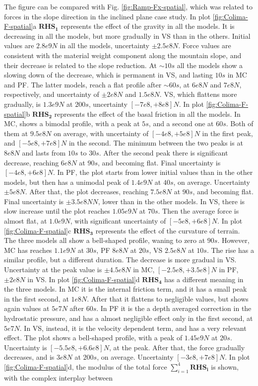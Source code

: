 \documentclass{article}
\begin{document}
The figure can be compared with Fig. \ref{fig:Ramp-Fx-spatial}, which was related to forces in the slope direction in the inclined plane case study. In plot \ref{fig:Colima-F-spatial}a $\boldsymbol{RHS_1}$ represents the effect of the gravity in all the models. It is decreasing in all the models, but more gradually in VS than in the others. Initial values are $2.8e9 N$ in all the models, uncertainty $\pm 2.5e8 N$. Force values are consistent with the material weight component along the mountain slope, and their decrease is related to the slope reduction. At $\sim 10 s$ all the models show a slowing down of the decrease, which is permanent in VS, and lasting $10 s$ in MC and PF. The latter models, reach a flat profile after $\sim 60 s$, at $6e8 N$ and $7e8 N$, respectively, and uncertainty of $\pm 2e8 N$ and $1.5e8 N$. VS, which flattens more gradually, is $1.3e9 N$ at $200 s$, uncertainty $[-7e8,+8e8] N$. In plot  \ref{fig:Colima-F-spatial}b $\boldsymbol{RHS_2}$ represents the effect of the basal friction in all the models. In MC, shows a bimodal profile, with a peak at $5 s$, and a second one at $60 s$. Both of them at $9.5e8 N$ on average, with uncertainty of $[-4e8,+5e8] N$ in the first peak, and $[-5e8,+7e8] N$ in the second. The minimum between the two peaks is at $8e8 N$ and lasts from $10 s$ to $30 s$. After the second peak there is significant decrease, reaching $6e8 N$ at $90 s$, and becoming flat. Final uncertainty is $[-4e8, +6e8] N$. In PF, the plot starts from lower initial values than in the other models, but then has a unimodal peak of $1.4e9 N$ at $40 s$, on average. Uncertainty $\pm 5e8 N$. After that, the plot decreases, reaching $7.5e8 N$ at $90 s$, and becoming flat. Final uncertainty is $\pm 3.5e8 N N$, lower than in the other models. In VS, there is slow increase until the plot reaches $1.05e9 N$ at $70 s$. Then the average force is almost flat, at $1.0e9 N$, with significant uncertainty of $[-5e8,+6e8] N$. In plot \ref{fig:Colima-F-spatial}c $\boldsymbol{RHS_3}$ represents the effect of the curvature of terrain. The three models all show a bell-shaped profile, waning to zero at $90 s$. However, MC has reaches $1.1e9 N$ at $30 s$, PF $8e8 N$ at $20 s$, VS $2.5e8 N$ at $10 s$. The rise has a similar profile, but a different duration. The decrease is more gradual in VS. Uncertainty at the peak value is $\pm 4.5e8 N$ in MC, $[-2.5e8,+3.5e8] N$ in PF, $\pm 2e8 N$ in VS. In plot \ref{fig:Colima-F-spatial}d $\boldsymbol{RHS_4}$ has a different meaning in the three models. In MC it is the internal friction term, and it has a small peak in the first second, at $1e8 N$. After that it flattens to negligible values, but shows again values at $5e7 N$ after $60 s$. In PF it is the a depth averaged correction in the hydrostatic pressure, and has a almost negligible effect only in the first second, at $5e7 N$. In VS, instead, it is the velocity dependent term, and has a very relevant effect. The plot shows a bell-shaped profile, with a peak of $1.45e9 N$ at $20 s$. Uncertainty is $[-5.5e8, +6.6e8] N$, at the peak. After that, the force gradually decreases, and is $3e8 N$ at $200 s$, on average. Uncertainty $[-3e8, +7e8] N$. In plot \ref{fig:Colima-F-spatial}d, the modulus of the total force $\sum^4_{i=1}\boldsymbol{RHS_i}$ is shown, with the complex interplay between 
\end{document}
